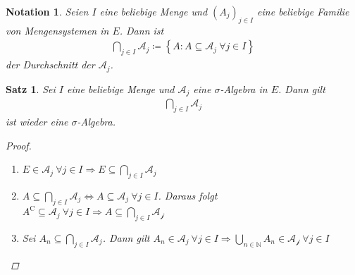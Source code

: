\documentclass[11pt, twoside, a4paper]{article}
\theoremstyle{plain}
\newtheorem{satz}[blockelement]{Satz}
\newtheorem{notation}[blockelement]{Notation}
\numberwithin{equation}{subsection}
\newcommand{\set}[1]{\left\{#1\right\}}
\newcommand{\equivalent}[0]{\Leftrightarrow{}}
\newcommand{\impl}[0]{\Rightarrow{}}
\newcommand{\comp}[1]{{#1}^{\mathrm{C}}}
\newcommand{\theoremescape}{\leavevmode}
\newcommand{\N}{\mathbb{N}}
\begin{document}
    \begin{notation}
        Seien $I$ eine beliebige Menge und $(A_j)_{j\in I}$ eine beliebige Familie von Mengensystemen in $E$. Dann ist
        \begin{align*}
            \bigcap_{j\in I} \mathcal{A}_j \coloneqq \set{A: A \subseteq \mathcal{A}_j~\forall j\in I}
        \end{align*}
        der Durchschnitt der $\mathcal{A}_j$.
    \end{notation}

    \begin{satz} %
        \label{satz:schnitt-sig-algebra}
        Sei $I$ eine beliebige Menge und $\mathcal{A}_j$ eine $\sigma$-Algebra in $E$. Dann gilt
        \begin{align*}
            \bigcap_{j\in I} \mathcal{A}_j
        \end{align*}
        ist wieder eine $\sigma$-Algebra.
        \begin{proof}
            \theoremescape
            \begin{enumerate}[label=(\roman*)]
                \item $E\in\mathcal{A}_j~\forall j\in I \impl E \subseteq \bigcap_{j\in I} \mathcal{A}_j$
                \item $A \subseteq \bigcap_{j\in I} \mathcal{A}_j \equivalent A \subseteq \mathcal{A}_j~\forall j\in I$. Daraus folgt $\comp{A} \subseteq \mathcal{A}_j~\forall j\in I \impl A \subseteq \bigcap_{j\in I}\mathcal{A_j}$
                \item Sei $A_n \subseteq \bigcap_{j\in I} \mathcal{A}_j$. Dann gilt $A_n \in \mathcal{A}_j~\forall j\in I \impl \bigcup_{n\in\N} A_n \in \mathcal{A_j}~\forall j\in I$
            \end{enumerate}
        \end{proof}
    \end{satz}
\end{document}

